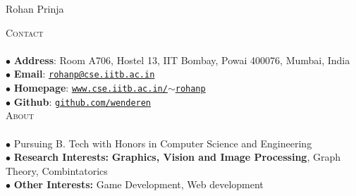 \documentclass[a4paper,9pt]{article}
\begin{document}

\textcolor{myrust}{\Huge{\centerline{Rohan Prinja}}}
\vspace{31pt}

\textcolor{myrust}{\large{\textsc{Contact}}}\textcolor{mygray}{\sout{\hfill}}\\\\
\normalsize
$\bullet$ \textbf{Address}: Room A706, Hostel 13, IIT Bombay, Powai 400076, Mumbai, India\\
$\bullet$ \textbf{Email}: \href{mailto:rohanp@cse.iitb.ac.in}{\texttt{rohanp@cse.iitb.ac.in}}\\
$\bullet$ \textbf{Homepage}: \href{http://www.cse.iitb.ac.in/~rohanp}{\texttt{www.cse.iitb.ac.in/$\sim$rohanp}}\\
$\bullet$ \textbf{Github}: \href{https://github.com/wenderen}{\texttt{github.com/wenderen}}\\

\textcolor{myrust}{\large{\textsc{About}}}\textcolor{mygray}{\sout{\hfill}}\\\\
\normalsize
$\bullet$ Pursuing B. Tech with Honors in Computer Science and Engineering\\
$\bullet$ \textbf{Research Interests:} \textbf{Graphics, Vision and Image Processing}, Graph Theory, Combintatorics\\
$\bullet$ \textbf{Other Interests:} Game Development, Web development\\
\end{document}
